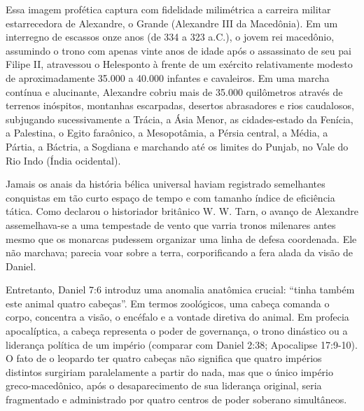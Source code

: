 \documentclass[11pt,a4paper,openany]{book}
\begin{document}
Essa imagem profética captura com fidelidade milimétrica a carreira militar estarrecedora de Alexandre, o Grande (Alexandre III da Macedônia). Em um interregno de escassos onze anos (de 334 a 323 a.C.), o jovem rei macedônio, assumindo o trono com apenas vinte anos de idade após o assassinato de seu pai Filipe II, atravessou o Helesponto à frente de um exército relativamente modesto de aproximadamente 35.000 a 40.000 infantes e cavaleiros. Em uma marcha contínua e alucinante, Alexandre cobriu mais de 35.000 quilômetros através de terrenos inóspitos, montanhas escarpadas, desertos abrasadores e rios caudalosos, subjugando sucessivamente a Trácia, a Ásia Menor, as cidades-estado da Fenícia, a Palestina, o Egito faraônico, a Mesopotâmia, a Pérsia central, a Média, a Pártia, a Báctria, a Sogdiana e marchando até os limites do Punjab, no Vale do Rio Indo (Índia ocidental).

Jamais os anais da história bélica universal haviam registrado semelhantes conquistas em tão curto espaço de tempo e com tamanho índice de eficiência tática. Como declarou o historiador britânico W. W. Tarn, o avanço de Alexandre assemelhava-se a uma tempestade de vento que varria tronos milenares antes mesmo que os monarcas pudessem organizar uma linha de defesa coordenada. Ele não marchava; parecia voar sobre a terra, corporificando a fera alada da visão de Daniel.

Entretanto, Daniel 7:6 introduz uma anomalia anatômica crucial: ``tinha também este animal quatro cabeças''.
Em termos zoológicos, uma cabeça comanda o corpo, concentra a visão, o encéfalo e a vontade diretiva do animal. Em profecia apocalíptica, a cabeça representa o poder de governança, o trono dinástico ou a liderança política de um império (comparar com Daniel 2:38; Apocalipse 17:9-10). O fato de o leopardo ter quatro cabeças não significa que quatro impérios distintos surgiriam paralelamente a partir do nada, mas que o único império greco-macedônico, após o desaparecimento de sua liderança original, seria fragmentado e administrado por quatro centros de poder soberano simultâneos.
\end{document}
